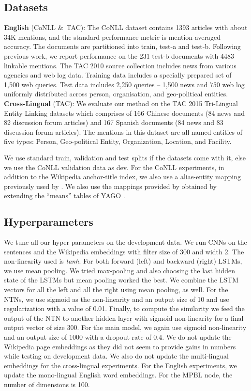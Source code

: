 \documentclass[letterpaper]{article} \usepackage{aaai18}  \usepackage{times}  \usepackage{helvet}  \usepackage{courier}  \usepackage{url}  \usepackage{graphicx}  \frenchspacing  \setlength{\pdfpagewidth}{8.5in}  \setlength{\pdfpageheight}{11in}  \usepackage{latexsym}
\begin{document}
\subsection{Datasets}
\textbf{English} (CoNLL \&\ TAC): The CoNLL dataset \cite{2011-emnlp-NE-disambig-yago} contains 1393 articles with about 34K mentions,
and the standard performance metric is
mention-averaged accuracy. The documents are
partitioned into train, test-a and test-b. Following previous work, we report performance on the 231 test-b
documents with 4483 linkable mentions. The TAC 2010 source collection includes news
from various agencies and web log data. Training
data includes a specially prepared set of 1,500
web queries. Test data includes 2,250 queries –
1,500 news and 750 web log uniformly distributed
across person, organisation, and geo-political entities. \\
\textbf{Cross-Lingual}   (TAC): We evaluate our method on the TAC 2015 Tri-Lingual Entity Linking datasets which comprises of 166 Chinese documents (84 news and 82 discussion forum articles) and 167 Spanish documents (84 news
and 83 discussion forum articles). The mentions in
this dataset are all named entities of five types: Person,
Geo-political Entity, Organization, Location,
and Facility.

We use standard train, validation and test splits if the datasets come with it, else we use the CoNLL validation data as dev. For the CoNLL experiments, in addition to the Wikipedia anchor-title index, we also use a alias-entity mapping previously used by \cite{pershina2015personalized,globerson2016collective,yamada2016joint}. We also use the mappings provided by \cite{2011-emnlp-NE-disambig-yago} obtained by extending the “means” tables
of YAGO \cite{hoffart2013yago2}.



\subsection{Hyperparameters}
We tune all our hyper-parameters on the development data. We run CNNs on the sentences and the Wikipedia embeddings with filter size of 300 and width 2. The non-linearity used is \textit{tanh}. For both forward (left) and backward (right) LSTMs, we use mean pooling. We tried max-pooling and also choosing the last hidden state of the LSTMs but mean pooling worked the best. We combine the LSTM vectors for all the left and all the right using mean pooling, as well. For the NTNs, we use sigmoid as the non-linearity and an output size of 10 and use  regularization with a value of 0.01. Finally, to compute the similarity we feed the output of the NTN to another hidden layer with sigmoid non-linearity for a final output vector of size 300. For the main model, we again use sigmoid non-linearity and an output size of 1000 with a dropout rate of 0.4. We do not update the Wikipedia page embeddings as they did not seem to provide gains in numbers while testing on development data. We also do not update the multi-lingual embeddings for the cross-lingual experiments. For the English experiments, we update the mono-lingual English word embeddings. For the MPBL node, the number of dimensions is 100.
\end{document}
